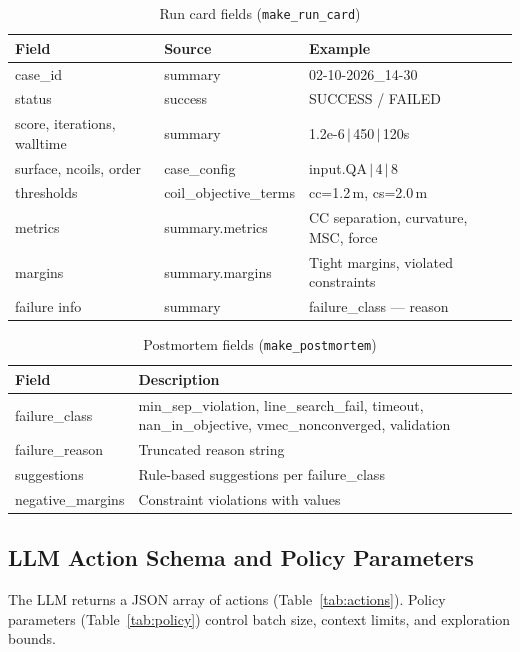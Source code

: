 \begin{table}[t]
  \centering
  \caption{Run card fields (\texttt{make\_run\_card})}
  \label{tab:run-card}
  \begin{tabular}{@{}lll@{}}
    \toprule
    \textbf{Field} & \textbf{Source} & \textbf{Example} \\
    \midrule
    case\_id & summary & 02-10-2026\_14-30 \\
    status & success & SUCCESS / FAILED \\
    score, iterations, walltime & summary & 1.2e-6\,$|$\,450\,$|$\,120s \\
    surface, ncoils, order & case\_config & input.QA\,$|$\,4\,$|$\,8 \\
    thresholds & coil\_objective\_terms & cc=1.2\,m, cs=2.0\,m \\
    metrics & summary.metrics & CC separation, curvature, MSC, force \\
    margins & summary.margins & Tight margins, violated constraints \\
    failure info & summary & failure\_class --- reason \\
    \bottomrule
  \end{tabular}
\end{table}

\begin{table}[t]
  \centering
  \caption{Postmortem fields (\texttt{make\_postmortem})}
  \label{tab:postmortem}
  \begin{tabular}{@{}p{4cm}p{7cm}@{}}
    \toprule
    \textbf{Field} & \textbf{Description} \\
    \midrule
    failure\_class & min\_sep\_violation, line\_search\_fail, timeout, nan\_in\_objective, vmec\_nonconverged, validation \\
    failure\_reason & Truncated reason string \\
    suggestions & Rule-based suggestions per failure\_class \\
    negative\_margins & Constraint violations with values \\
    \bottomrule
  \end{tabular}
\end{table}

\subsection{LLM Action Schema and Policy Parameters}

The LLM returns a JSON array of actions (Table~\ref{tab:actions}). Policy parameters (Table~\ref{tab:policy}) control batch size, context limits, and exploration bounds.

